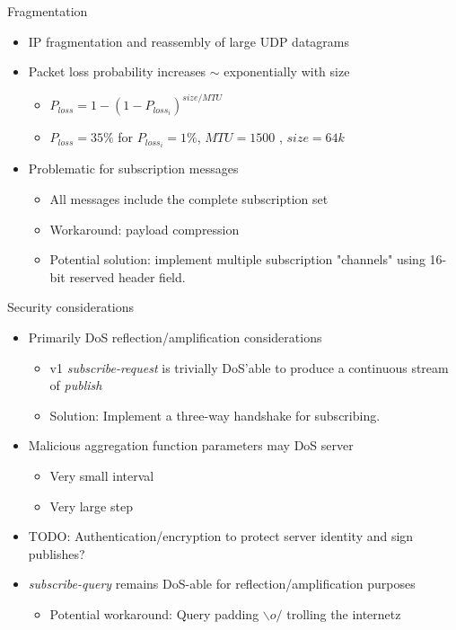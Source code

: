 \documentclass{beamer}
\begin{document}
\begin{frame}{Fragmentation}
\begin{itemize}
	\item IP fragmentation and reassembly of large UDP datagrams
	\item 	Packet loss probability increases $\sim$ exponentially with size
	\begin{itemize}
		\item $P_{loss} = 1 - (1 - P_{loss_i})^{size / MTU}$
		\item $P_{loss} = 35\%$ for $ P_{loss_i} = 1\% $, $MTU = 1500$ , $size = 64k$	
	\end{itemize}
	\item Problematic for subscription messages
	\begin{itemize}
		\item All messages include the complete subscription set
		\item Workaround: payload compression
		\item Potential solution: implement multiple subscription "channels" using 16-bit reserved header field.
	\end{itemize}
\end{itemize}
\end{frame}

\begin{frame}{Security considerations}
\begin{itemize}
	\item Primarily DoS reflection/amplification considerations
	\begin{itemize}
  		\item v1 \emph{subscribe-request} is trivially DoS'able to produce a continuous stream of \emph{publish}
  		\item Solution: Implement a three-way handshake for subscribing.
	\end{itemize}
  	\item Malicious aggregation function parameters may DoS server
  	\begin{itemize}
  		\item Very small interval
  		\item Very large step
  	\end{itemize}
  	\item TODO: Authentication/encryption to protect server identity and sign publishes?
  	\item \emph{subscribe-query} remains DoS-able for reflection/amplification purposes
  	\begin{itemize}
  		\item Potential workaround: Query padding $\backslash o /$ {\tiny trolling the internetz}
  	\end{itemize}
\end{itemize}
\end{frame}
\end{document}

